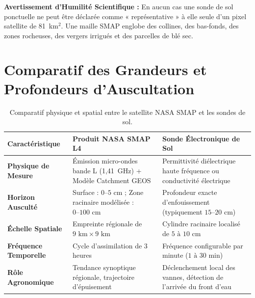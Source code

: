 \documentclass[11pt,a4paper,oneside]{report}
\begin{document}
\begin{warningbox}
\textbf{Avertissement d'Humilité Scientifique :} En aucun cas une sonde de sol ponctuelle ne peut être déclarée comme « représentative » à elle seule d'un pixel satellite de 81~km$^2$. Une maille SMAP englobe des collines, des bas-fonds, des zones rocheuses, des vergers irrigués et des parcelles de blé sec.
\end{warningbox}

\section{Comparatif des Grandeurs et Profondeurs d'Auscultation}
\begin{table}[h!]
\centering
\small
\begin{tabularx}{\linewidth}{lXX}
\toprule
\textbf{Caractéristique} & \textbf{Produit NASA SMAP L4} & \textbf{Sonde Électronique de Sol} \\
\midrule
\textbf{Physique de Mesure} & Émission micro-ondes bande L (1,41~GHz) + Modèle Catchment GEOS & Permittivité diélectrique haute fréquence ou conductivité électrique \\
\textbf{Horizon Ausculté} & Surface : $0–5\text{ cm}$ ; Zone racinaire modélisée : $0–100\text{ cm}$ & Profondeur exacte d'enfouissement (typiquement $15–20\text{ cm}$) \\
\textbf{Échelle Spatiale} & Empreinte régionale de $9\text{ km} \times 9\text{ km}$ & Cylindre racinaire localisé de $5\text{ à }10\text{ cm}$ \\
\textbf{Fréquence Temporelle} & Cycle d'assimilation de 3 heures & Fréquence configurable par minute ($1\text{ à }30\text{ min}$) \\
\textbf{Rôle Agronomique} & Tendance synoptique régionale, trajectoire d'épuisement & Déclenchement local des vannes, détection de l'arrivée du front d'eau \\
\bottomrule
\end{tabularx}
\caption{Comparatif physique et spatial entre le satellite NASA SMAP et les sondes de sol.}
\end{table}
\end{document}
